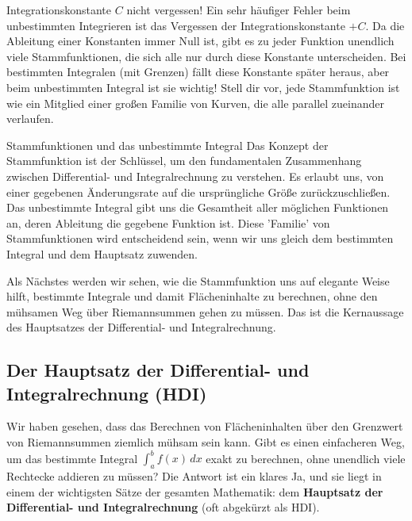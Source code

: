 \begin{fehlerboxumgebung}{Integrationskonstante $C$ nicht vergessen!}
Ein sehr häufiger Fehler beim unbestimmten Integrieren ist das Vergessen der Integrationskonstante $+C$. Da die Ableitung einer Konstanten immer Null ist, gibt es zu jeder Funktion unendlich viele Stammfunktionen, die sich alle nur durch diese Konstante unterscheiden. Bei bestimmten Integralen (mit Grenzen) fällt diese Konstante später heraus, aber beim unbestimmten Integral ist sie wichtig! Stell dir vor, jede Stammfunktion ist wie ein Mitglied einer großen Familie von Kurven, die alle parallel zueinander verlaufen.
\end{fehlerboxumgebung}

\begin{warumwichtigumgebung}{Stammfunktionen und das unbestimmte Integral}
Das Konzept der Stammfunktion ist der Schlüssel, um den fundamentalen Zusammenhang zwischen Differential- und Integralrechnung zu verstehen. Es erlaubt uns, von einer gegebenen Änderungsrate auf die ursprüngliche Größe zurückzuschließen. Das unbestimmte Integral gibt uns die Gesamtheit aller möglichen Funktionen an, deren Ableitung die gegebene Funktion ist. Diese 'Familie' von Stammfunktionen wird entscheidend sein, wenn wir uns gleich dem bestimmten Integral und dem Hauptsatz zuwenden.
\end{warumwichtigumgebung}

Als Nächstes werden wir sehen, wie die Stammfunktion uns auf elegante Weise hilft, bestimmte Integrale und damit Flächeninhalte zu berechnen, ohne den mühsamen Weg über Riemannsummen gehen zu müssen. Das ist die Kernaussage des Hauptsatzes der Differential- und Integralrechnung.



\subsection{Der Hauptsatz der Differential- und Integralrechnung (HDI)}
\label{subsec:hdi}

Wir haben gesehen, dass das Berechnen von Flächeninhalten über den Grenzwert von Riemannsummen ziemlich mühsam sein kann. Gibt es einen einfacheren Weg, um das bestimmte Integral $\int_a^b f(x) \,dx$ exakt zu berechnen, ohne unendlich viele Rechtecke addieren zu müssen? Die Antwort ist ein klares Ja, und sie liegt in einem der wichtigsten Sätze der gesamten Mathematik: dem \textbf{Hauptsatz der Differential- und Integralrechnung} (oft abgekürzt als HDI).

